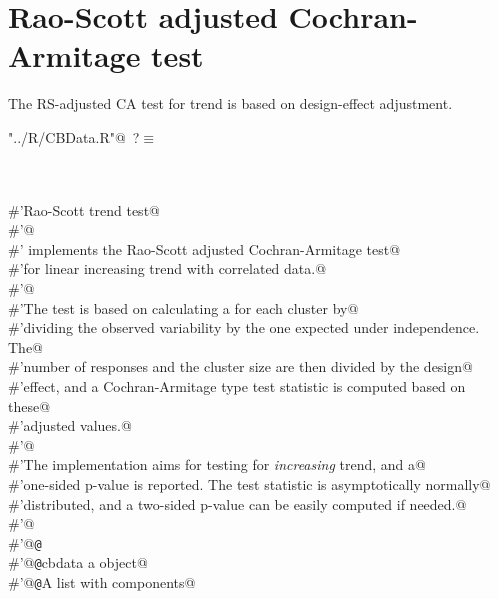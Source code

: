 \documentclass[reqno]{amsart}
\renewcommand{\NWtarget}[2]{\hypertarget{#1}{#2}}
\begin{document}
\section{Rao-Scott adjusted Cochran-Armitage test}
The RS-adjusted CA test for trend is based on design-effect adjustment.

\begin{flushleft} \small\label{scrap10}\raggedright\small
\NWtarget{nuweb?}{} \verb@"../R/CBData.R"@\nobreak\ {\footnotesize {?}}$\equiv$
\vspace{-1ex}
\begin{list}{}{} \item
\mbox{}\verb@@\\
\mbox{}\verb@@\\
\mbox{}\verb@#'Rao-Scott trend test@\\
\mbox{}\verb@#'@\\
\mbox{}\verb@#' implements the Rao-Scott adjusted Cochran-Armitage test@\\
\mbox{}\verb@#'for linear increasing trend with correlated data.@\\
\mbox{}\verb@#'@\\
\mbox{}\verb@#'The test is based on calculating a  for each cluster by@\\
\mbox{}\verb@#'dividing the observed variability by the one expected under independence. The@\\
\mbox{}\verb@#'number of responses and the cluster size are then divided by the design@\\
\mbox{}\verb@#'effect, and a Cochran-Armitage type test statistic is computed based on these@\\
\mbox{}\verb@#'adjusted values.@\\
\mbox{}\verb@#'@\\
\mbox{}\verb@#'The implementation aims for testing for \emph{increasing} trend, and a@\\
\mbox{}\verb@#'one-sided p-value is reported. The test statistic is asymptotically normally@\\
\mbox{}\verb@#'distributed, and a two-sided p-value can be easily computed if needed.@\\
\mbox{}\verb@#'@\\
\mbox{}\verb@#'@{\tt @}\verb@export@\\
\mbox{}\verb@#'@{\tt @}\verb@param cbdata a  object@\\
\mbox{}\verb@#'@{\tt @}\verb@return A list with components@\\

\end{list}
\end{flushleft}
\end{document}
